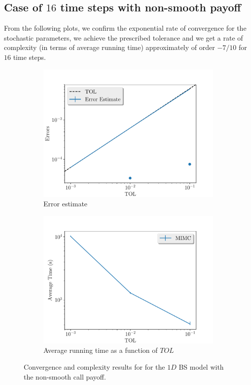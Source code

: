 \documentclass[11pt]{article}
\begin{document}
\newpage
\subsection{Case of $16$ time steps with non-smooth payoff}

From the following plots, we confirm the exponential rate of convergence for the stochastic parameters, we achieve the prescribed tolerance and  we get a rate of complexity (in terms of average running time) approximately of order $-7/10$ for $16$ time steps.
\begin{figure}[!h]
	\centering
	\begin{subfigure}{.5\textwidth}
		\centering
		\includegraphics[width=1\linewidth]{./figures/1D_BS_16_steps_non_smooth/error_estimate.pdf}
		\caption{Error estimate}
		\label{fig:misc_1D_BS_non_smooth_16steps_sub1}
	\end{subfigure}%
	\begin{subfigure}{.5\textwidth}
		\centering
		\includegraphics[width=1\linewidth]{./figures/1D_BS_16_steps_non_smooth/average_running_time.pdf}
		\caption{Average running time as a function of $TOL$}
		\label{fig:misc_1D_BS_non_smooth_816steps_sub2}
	\end{subfigure}%
	\caption{Convergence and complexity results for for the $1D$ BS model with the non-smooth call payoff.}
	\label{fig:misc_1D_BS_nonsmooth_16steps_2}
\end{figure}
\end{document}
